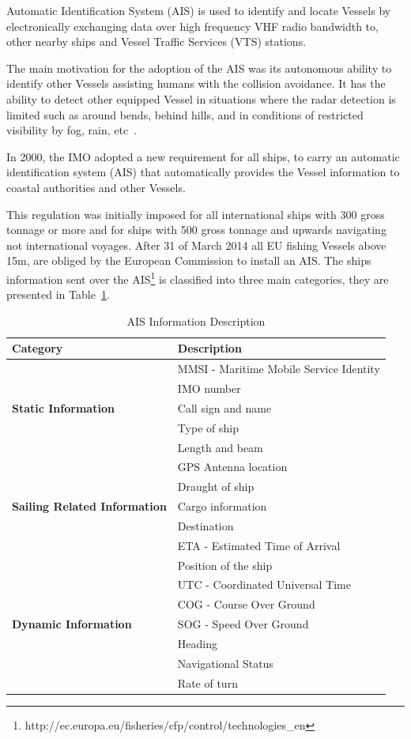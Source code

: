 Automatic Identification System (AIS) is used to identify and locate Vessels by electronically exchanging data over high frequency VHF radio bandwidth to, other nearby ships and Vessel Traffic Services (VTS) stations.

The main motivation for the adoption of the AIS was its autonomous ability to identify other Vessels assisting humans with the collision avoidance. It has the ability to detect other equipped Vessel in situations where the radar detection is limited such as around bends, behind hills, and in conditions of restricted visibility by fog, rain, etc~\cite{Harati-Mokhtari2007}. 

In 2000, the IMO adopted a new requirement for all ships, to carry an automatic identification system (AIS) that automatically provides the Vessel information to coastal authorities and other Vessels.

This regulation was initially imposed for all international ships with 300 gross tonnage or more and for ships with 500 gross tonnage and upwards navigating not international voyages. After 31 of March 2014 all EU fishing Vessels above 15m, are obliged by the European Commission to install an AIS.
The ships information sent over the AIS\footnote{http://ec.europa.eu/fisheries/cfp/control/technologies\_en} is classified into three main categories, they are presented in Table~\ref{Table: AIS Categories}.
\begin{table}[H]
\centering
\caption{AIS Information Description}
\label{Table: AIS Categories}
\begin{tabular}{|l|l|}
\hline
\textbf{Category} & \textbf{Description} \\ \hline
 & MMSI - Maritime Mobile Service Identity \\ \cline{2-2} 
 & IMO number \\ \cline{2-2} 
\textbf{Static Information} & Call sign and name \\ \cline{2-2} 
 & Type of ship \\ \cline{2-2} 
 & Length and beam \\ \cline{2-2} 
 & GPS Antenna location \\ \hline
 & Draught of ship \\ \cline{2-2} 
\textbf{Sailing Related Information} & Cargo information \\ \cline{2-2} 
 & Destination \\ \cline{2-2} 
 & ETA - Estimated Time of Arrival \\ \hline
 & Position of the ship \\ \cline{2-2} 
 & UTC - Coordinated Universal Time \\ \cline{2-2} 
 & COG - Course Over Ground \\ \cline{2-2} 
\textbf{Dynamic Information} & SOG - Speed Over Ground \\ \cline{2-2} 
 & Heading \\ \cline{2-2}
 & Navigational Status \\ \cline{2-2}
 & Rate of turn \\ \hline
\end{tabular}
\end{table}

